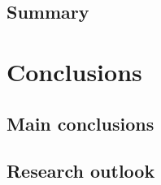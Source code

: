 \section{Summary}

\lipsum[7]

\chapter{Conclusions}

\section{Main conclusions}

\lipsum[8]

\section{Research outlook}

\lipsum[9]

